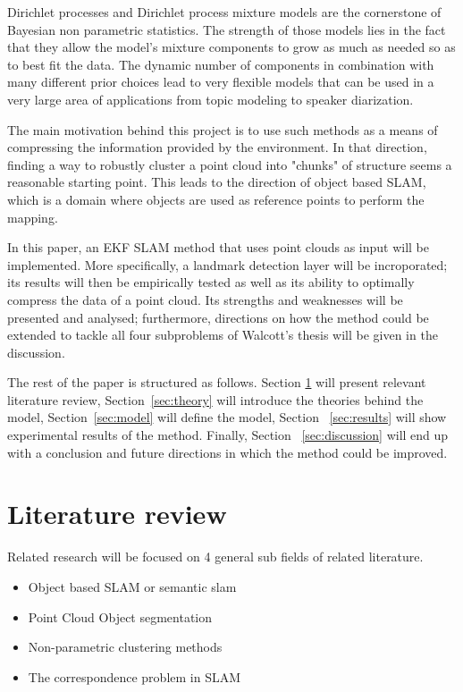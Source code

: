 \documentclass[twoside,hidelinks]{article}
\begin{document}
Dirichlet processes and Dirichlet process mixture models \cite{nonParam} are the cornerstone of Bayesian non parametric statistics. The strength of those models lies in the fact that they allow the model's mixture components to grow as much as needed so as to best fit the data. The dynamic number of components in combination with many different prior choices lead to very flexible models that can be used in a very large area of applications from topic modeling\cite{LDA} to speaker diarization\cite{speakerDiar}. 

The main motivation behind this project is to use such methods as a means of compressing the information provided by the environment. In that direction, finding a way to robustly cluster a point cloud into "chunks" of structure seems a reasonable starting point. This leads to the direction of object based SLAM, which is a domain where objects are used as reference points to perform the mapping.

In this paper, an EKF SLAM method that uses point clouds as input will be implemented. More specifically, a landmark detection layer will be incroporated; its results will then be empirically tested as well as its ability to optimally compress the data of a point cloud. Its strengths and weaknesses will be presented and analysed; furthermore, directions on how the method could be extended to tackle all four subproblems of Walcott's thesis will be given in the discussion.

The rest of the paper is structured as follows. Section \ref{sec:literature} will present relevant literature review, Section~\ref{sec:theory} will introduce the theories behind the model, Section~\ref{sec:model} will define the model, Section ~\ref{sec:results} will show experimental results of the method. Finally, Section ~\ref{sec:discussion} will end up with a conclusion and future directions in which the method could be improved.

\section{Literature review}
\label{sec:literature}

Related research will be focused on 4 general sub fields of related literature.
\begin{itemize}
	\item Object based SLAM or semantic slam
	\item Point Cloud Object segmentation
	\item Non-parametric clustering methods
	\item The correspondence problem in SLAM
\end{itemize}
\end{document}
